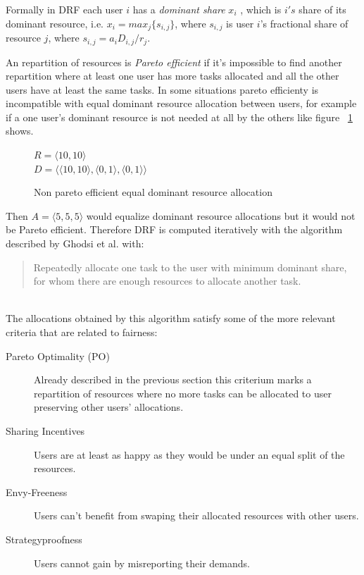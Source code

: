 \documentclass{report}                     %
\begin{document}
Formally in DRF each user $i$ has a \emph{dominant share} $x_{i}$ ,
which is $i's$ share of its dominant resource, i.e. $x_{i} = max_{j}\{s_{i,j}\}$,
where $s_{i,j}$ is user $i$'s fractional share of resource $j$, where
$s_{i,j} = a_{i}D_{i,j}/r_{j}$.

An repartition of resources is \emph{Pareto efficient} if it's impossible
to find another repartition where at least one user has more tasks
allocated and all the other users have at least the same tasks. In some 
situations pareto efficienty is incompatible with equal dominant resource
allocation between users, for example if a one user's dominant resource
is not needed at all by the others like figure ~\ref{fig:nonpareto} shows. \\

\begin{figure}[!ht]
\centering
$R = \langle 10, 10 \rangle$ \\
$D = \langle \langle 10, 10 \rangle, \langle 0, 1 \rangle, \langle 0, 1 \rangle \rangle$ \\
\caption{Non pareto efficient equal dominant resource allocation}
\label{fig:nonpareto}
\end{figure}

Then $A = \langle 5, 5, 5 \rangle$ would equalize dominant resource
allocations but it would not be Pareto efficient. Therefore DRF is computed
iteratively with the algorithm described by Ghodsi et al. with: \\

\blockquote{Repeatedly allocate one task to the user with minimum dominant
share, for whom there are enough resources to allocate another task.} \\

The allocations obtained by this algorithm satisfy some of the more
relevant criteria that are related to fairness: \\

\begin{description}
  \item[Pareto Optimality (PO)] Already described in the previous
  section this criterium marks a repartition of resources where
  no more tasks can be allocated to user preserving other users'
  allocations.
  \item[Sharing Incentives]  Users are at least as happy as they
  would be under an equal split of the resources.
  \item[Envy-Freeness] Users can't benefit from swaping their
  allocated resources with other users.
  \item[Strategyproofness] Users cannot gain by misreporting
  their demands.
\end{description}
\end{document}
